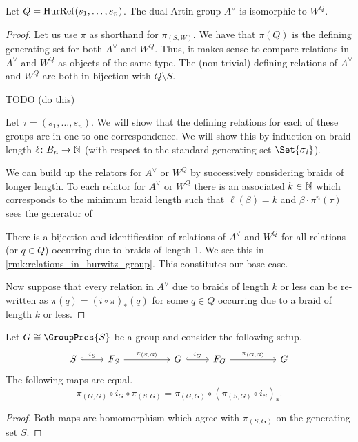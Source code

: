 \begin{lemma}
	Let $Q=\operatorname{HurRef}(s_1,\ldots,s_n)$.
	The dual Artin group $A^\vee$ is isomorphic to $W^Q$.
\end{lemma}
\begin{proof}
	Let us use $\pi$ as shorthand for  $\pi_{(S,W)}$.
	We have that $\pi(Q)$ is the defining generating set for both $A^\vee$ and  $W^Q$.
	Thus, it makes sense to compare relations in $A^\vee$ and  $W^Q$ as objects of the same type.
	The (non-trivial) defining relations of $A^\vee$ and $W^Q$ are both in bijection with $Q \setminus S$.

	TODO (do this)

	Let $\tau = (s_1,\ldots,s_n)$.
	We will show that the defining relations for each of these groups are in one to one correspondence.
	We will show this by induction on braid length $\ell \colon B_n \to \mathbb{N}$ (with respect to the standard generating set $\Set{\sigma_i}$).

	We can build up the relators for $A^\vee$ or  $W^Q$ by successively considering braids of longer length.
	To each relator for  $A^\vee$ or $W^Q$ there is an associated $k \in \mathbb{N}$ which corresponds to the minimum braid length  such that $\ell(\beta) = k$ and $\beta \cdot \pi^n(\tau)$ sees the generator of

	There is a bijection and identification of relations of $A^\vee$ and  $W^Q$ for all relations (or $q \in Q$) occurring  due to braids of length 1.
	We see this in \cref{rmk:relations_in_hurwitz_group}.
	This constitutes our base case.

	Now suppose that every relation in $A^\vee$ due to braids of length  $k$ or less can be re-written as  $\pi(q)=(i\circ \pi)_*(q)$ for some  $q \in Q$ occurring due to a braid of length  $k$ or less.
\end{proof}
\begin{lemma}
	Let $G \cong \GroupPres{S}$ be a group and consider the following setup.
	\[
		\begin{tikzcd}
			S \ar[r, hook, "i_S"] & F_S \ar[rr, "\pi_{(S,G)}"] & & G \ar[r, hook, "i_G"] & F_G \ar[rr, "\pi_{(G,G)}"] & & G
		\end{tikzcd}
	\]
	The following maps are equal.
	\[
		\pi_{(G,G)} \circ i_G \circ \pi_{(S,G)} = \pi_{(G,G)} \circ (\pi_{(S,G)} \circ i_S)_*
		.\]
	\label{lem:group_projections}
\end{lemma}

\begin{proof}
	Both maps are homomorphism which agree with $\pi_{\left( S,G\right)}$ on the generating set $S$.
\end{proof}

